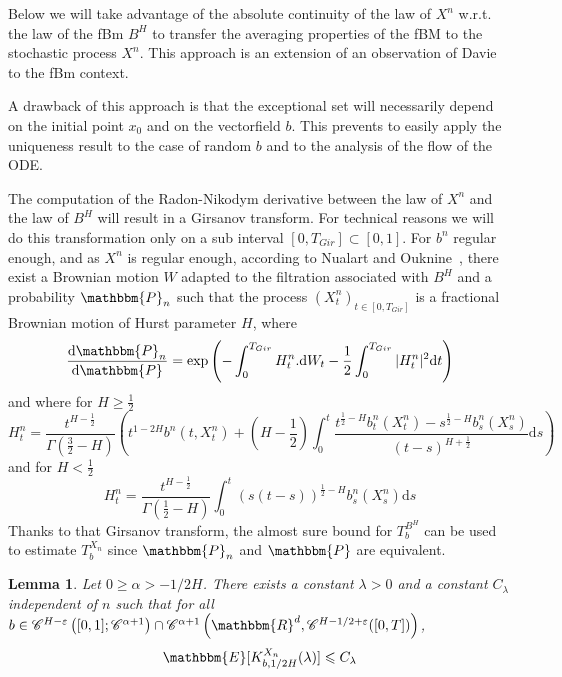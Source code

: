 \documentclass[a4paper,11pt]{article}
\newcommand{\mathd}{\mathrm{d}}
\newtheorem{lemma}[theorem]{Lemma}
\newcommand{\CC}{\mathscr C}
\begin{document}
Below we will take advantage of the absolute continuity of the law of $X^{n}$
w.r.t. the law of the fBm $B^{H}$ to transfer the averaging properties of the
fBM to the stochastic process $X^{n}$. This approach is an extension of an
observation of Davie~{\cite{MR2377011}} to the fBm context.

A drawback of this approach is that the exceptional set will necessarily
depend on the initial point $x_{0}$ and on the vectorfield $b$. This prevents
to easily apply the uniqueness result to the case of random $b$ and to the
analysis of the flow of the ODE.

The computation of the Radon-Nikodym derivative between the law of $X^{n}$ and
the law of $B^{H}$ will result in a Girsanov transform. For technical reasons
we will do this transformation only on a sub interval $[0,T_{Gir} ] \subset
[0,1]$. For $b^{n}$ regular enough, and as $X^{n}$ is regular enough,
according to Nualart and Ouknine~{\cite{MR1934157}}, there exist a Brownian
motion $W$ adapted to the filtration associated with $B^{H}$ and a probability
$\mathbbm{P}_{n}$ such that the process $(X^{n}_{t} )_{t \in [0,T_{Gir} ]}$ is
a fractional Brownian motion of Hurst parameter $H$, where
\[ \frac{\mathd \mathbbm{P}_{n}}{\mathd \mathbbm{P}} = \exp   \left( -
   \int_{0}^{T_{Gir}} H_{t}^{n} . \mathd W_{t} - \frac{1}{2} 
   \int_{0}^{T_{Gir}} | H^{n}_{t} |^{2} \mathd t \right) \]
and where for $H \ge \frac{1}{2}$
\[ H_{t}^{n} = \frac{t^{H- \frac{1}{2}}}{\Gamma ( \frac{3}{2} -H)}  \left(
   t^{1-2H} b^{n} (t,X^{n}_{t} )+ \left( H- \frac{1}{2} \right)  \int_{0}^{t}
   \frac{t^{\frac{1}{2} -H} b^{n}_{t} (X^{n}_{t} )-s^{\frac{1}{2} -H}
   b^{n}_{s} (X^{n}_{s} )}{(t-s)^{H+ \frac{1}{2}}} \mathd s \right) \]
and for $H< \frac{1}{2}$
\[ H_{t}^{n} = \frac{t^{H- \frac{1}{2}}}{\Gamma ( \frac{1}{2} -H)} 
   \int_{0}^{t} ( s(t-s) )^{\frac{1}{2} -H} b^{n}_{s} (X^{n}_{s} ) \mathd s \]
Thanks to that Girsanov transform, the almost sure bound for $T^{B^{H}}_{b}$
can be used to estimate $T^{X_{n}}_{b}$ since $\mathbbm{P}_{n}$ and
$\mathbbm{P}$ are equivalent.

\begin{lemma}
  \label{majoration Qn}Let $0 \geqslant \alpha >-1/2H$. There exists a
  constant $\lambda >0$ and a constant $C_{\lambda}$ independent of $n$ such
  that for all $b \in \CC^{H- \varepsilon} \left( [ 0,1 ] ; \CC^{\alpha +1}
  \right) \cap \CC^{\alpha +1} \left( \mathbbm{R}^{d} , \CC^{H-1/2+
  \varepsilon} ( [ 0,T ] ) \right)$,
  \[ \mathbbm{E} [ K^{X_{n}}_{b,1/2H} ( \lambda ) ] \leqslant C_{\lambda} \]
\end{lemma}
\end{document}
